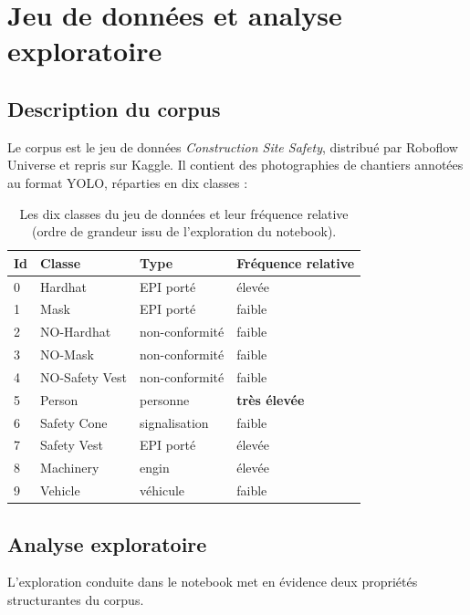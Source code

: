 \documentclass[11pt,a4paper]{article}
\begin{document}
\section{Jeu de données et analyse exploratoire}

\subsection{Description du corpus}

Le corpus est le jeu de données \emph{Construction Site Safety}, distribué
par Roboflow Universe et repris sur Kaggle. Il contient des photographies de
chantiers annotées au format YOLO, réparties en dix classes :

\begin{table}[H]
\centering
\caption{Les dix classes du jeu de données et leur fréquence relative (ordre de grandeur issu de l'exploration du notebook).}
\begin{tabular}{@{}p{1.2cm}p{3.8cm}p{3.6cm}p{4.6cm}@{}}
\toprule
\textbf{Id} & \textbf{Classe} & \textbf{Type} & \textbf{Fréquence relative} \\
\midrule
0 & Hardhat          & EPI porté        & élevée \\
1 & Mask             & EPI porté        & faible \\
2 & NO-Hardhat       & non-conformité   & faible \\
3 & NO-Mask          & non-conformité   & faible \\
4 & NO-Safety Vest   & non-conformité   & faible \\
5 & Person           & personne         & \textbf{très élevée} \\
6 & Safety Cone      & signalisation    & faible \\
7 & Safety Vest      & EPI porté        & élevée \\
8 & Machinery        & engin            & élevée \\
9 & Vehicle          & véhicule         & faible \\
\bottomrule
\end{tabular}
\end{table}

\subsection{Analyse exploratoire}

L'exploration conduite dans le notebook met en évidence deux propriétés
structurantes du corpus.
\end{document}

